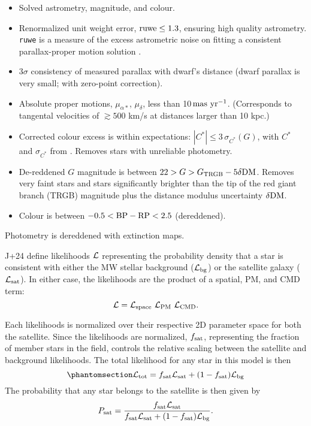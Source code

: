\begin{itemize}
\tightlist
\item
  Solved astrometry, magnitude, and colour.
\item
  Renormalized unit weight error, \({\rm ruwe} \leq 1.3\), ensuring high
  quality astrometry. \texttt{ruwe} is a measure of the excess
  astrometric noise on fitting a consistent parallax-proper motion
  solution \citep[see][]{lindegrenXXX}.
\item
  3\(\sigma\) consistency of measured parallax with dwarf's distance
  (dwarf parallax is very small; with \citet{lindegren+2021} zero-point
  correction).
\item
  Absolute proper motions, \(\mu_{\alpha*}\), \(\mu_\delta\), less than
  10\(\,{\rm mas\ yr^{-1}}\). (Corresponds to tangental velocities of
  \(\gtrsim 500\) km/s at distances larger than 10 kpc.)
\item
  Corrected colour excess is within expectations:
  \(|C^*| \leq 3\,\sigma_{C^*}(G)\), with \(C^*\) and \(\sigma_{C^*}\)
  from \citet{riello+2021}. Removes stars with unreliable photometry.
\item
  De-reddened \(G\) magnitude is between
  \(22 > G > G_{\rm TRGB} - 5\delta\rm {DM}\). Removes very faint stars
  and stars significantly brighter than the tip of the red giant branch
  (TRGB) magnitude plus the distance modulus uncertainty
  \(\delta {\rm DM}\).
\item
  Colour is between \(-0.5 < {\rm BP - RP} <  2.5\) (dereddened).
\end{itemize}

Photometry is dereddened with \citet{schlegel+finkbeiner+davis1998}
extinction maps.

J+24 define likelihoods \({\cal L}\) representing the probability
density that a star is consistent with either the MW stellar background
(\({\cal L}_{\rm bg}\)) or the satellite galaxy
(\({\cal L}_{\rm sat}\)). In either case, the likelihoods are the
product of a spatial, PM, and CMD term: \begin{equation}
{\cal L} = {\cal L}_{\rm space}\ {\cal L}_{\rm PM}\ {\cal L}_{\rm CMD}.
\end{equation}

Each likelihoods is normalized over their respective 2D parameter space
for both the satellite. Since the likelihoods are normalized,
\(f_{\rm sat}\), representing the fraction of member stars in the field,
controls the relative scaling between the satellite and background
likelihoods. The total likelihood for any star in this model is then
\begin{equation}\protect\phantomsection\label{eq:Ltot}{
{\cal L}_{\rm tot} = f_{\rm sat}{\cal L}_{\rm sat} + (1-f_{\rm sat}){\cal L}_{\rm bg}
}\end{equation} The probability that any star belongs to the satellite
is then given by \begin{equation}
P_{\rm sat} = \frac{f_{\rm sat}{\cal L}_{\rm sat}}{f_{\rm sat}{\cal L}_{\rm sat} + (1-f_{\rm sat}){\cal L}_{\rm bg}}.
\end{equation}

